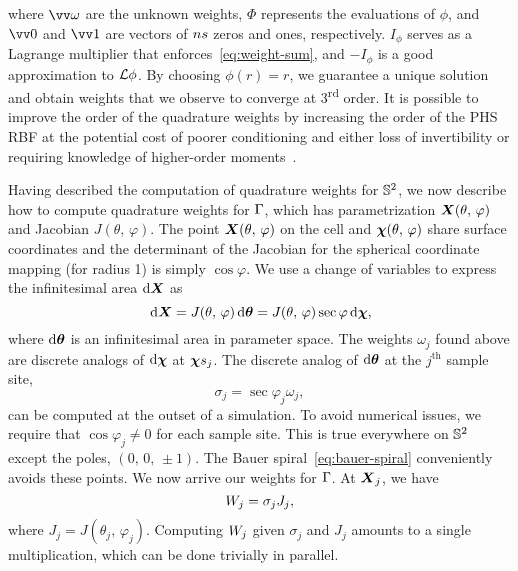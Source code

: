 where $\arr{\omega}$ are the unknown weights, $\Phi$ represents the evaluations of
$\phi$, and $\arr{0}$ and $\arr{1}$ are vectors of $\sample\cardinality$ zeros and ones,
respectively.
$I_{\phi}$ serves as a Lagrange multiplier that enforces~\eqref{eq:weight-sum}, and
$-I_\phi$ is a good approximation to $\mathcal{L}\phi$. By choosing $\phi(r) = r$, we guarantee a
unique solution and obtain weights that we observe to converge at 3\textsuperscript{rd}
order. It is possible to improve the order of the quadrature weights by increasing the
order of the PHS RBF at the potential cost of poorer conditioning and either loss of
invertibility or requiring knowledge of higher-order moments~\cite{Fuselier:2013coba}.

Having described the computation of quadrature weights for $\mathbb{S}^2$, we now
describe how to compute quadrature weights for $\Gamma$, which has parametrization
$\boldsymbol{X}(\theta,\,\varphi)$ and Jacobian $J(\theta,\,\varphi)$. The point
$\boldsymbol{X}(\theta,\,\varphi)$ on the cell and $\boldsymbol{\chi}(\theta,\,\varphi)$ share surface coordinates
and the determinant of the Jacobian for the spherical coordinate mapping (for radius 1) is simply $\cos\varphi$.  We use a change of variables to
express the infinitesimal area $\d\X$ as
\begin{equation}\label{eq:quad-cov}
    \d\X
    = J(\theta,\,\varphi)\d\qs
    = J(\theta,\,\varphi)\sec\varphi\d\Xp,
\end{equation}
where $\d\qs$ is an infinitesimal area in parameter space. The weights $\omega_j$ found
above are discrete analogs of $\d\Xp$ at $\sample\Xp_j$. The discrete analog of $\d\qs$
at the $j^\text{th}$ sample site,
\begin{equation*}
    \sigma_j=\sec\varphi_j\omega_j,
\end{equation*}
can be computed at the outset of a simulation. To avoid numerical issues, we require that
$\cos\varphi_j \neq 0$ for each sample site. This is true everywhere on $\mathbb{S}^2$ except
the poles, $(0,\,0,\,\pm1)$. The Bauer spiral~\eqref{eq:bauer-spiral} conveniently avoids
these points. We now arrive our weights for $\Gamma$. At $\boldsymbol{X}_j$, we have
\begin{equation}
    \weight[j] = \sigma_j J_j,
\end{equation}
where $J_j = J(\theta_j,\,\varphi_j)$. Computing $\weight[j]$ given $\sigma_j$ and $J_j$
amounts to a single multiplication, which can be done trivially in parallel.

